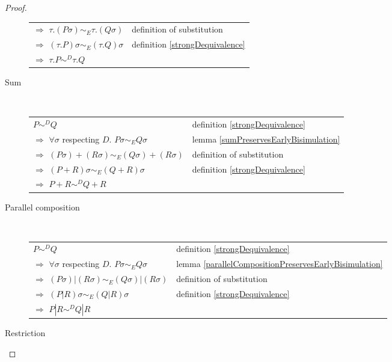 \begin{lemma}
\begin{proof}
\begin{description}
\begin{center}
\begin{tabular}{ll}
	  \\
	      $\Rightarrow$ $\tau.(P\sigma) \sim_{E} \tau.(Q\sigma)$
	    &
	      definition of substitution
	  \\
	      $\Rightarrow$ $(\tau.P)\sigma \sim_{E} (\tau.Q)\sigma$
	    &
	      definition \ref{strongDequivalence}
	  \\
	      $\Rightarrow$ $\tau.P \sim^{D} \tau.Q$
	    &
	  \end{tabular}
	\end{center}
      \item[Sum]\hfill \\
	\begin{center}
	  \begin{tabular}{ll}
	      $P \sim^{D} Q$
	    &
	      definition \ref{strongDequivalence}
	  \\
	      $\Rightarrow$ $\forall \sigma$ respecting $D.$ $P\sigma \sim_{E} Q\sigma$
	    &
	      lemma \ref{sumPreservesEarlyBisimulation}
	  \\
	      $\Rightarrow$ $(P\sigma)+(R\sigma) \sim_{E} (Q\sigma)+(R\sigma)$
	    &
	      definition of substitution
	  \\
	      $\Rightarrow$ $(P+R)\sigma \sim_{E} (Q+R)\sigma$
	    &
	      definition \ref{strongDequivalence}
	  \\
	      $\Rightarrow$ $P+R \sim^{D} Q+R$
	    &
	  \end{tabular}
	\end{center}
      \item[Parallel composition]\hfill \\
	\begin{center}
	  \begin{tabular}{ll}
	      $P \sim^{D} Q$
	    &
	      definition \ref{strongDequivalence}
	  \\
	      $\Rightarrow$ $\forall \sigma$ respecting $D.$ $P\sigma \sim_{E} Q\sigma$
	    &
	      lemma \ref{parallelCompositionPreservesEarlyBisimulation}
	  \\
	      $\Rightarrow$ $(P\sigma)|(R\sigma) \sim_{E} (Q\sigma)|(R\sigma)$
	    &
	      definition of substitution
	  \\
	      $\Rightarrow$ $(P|R)\sigma \sim_{E} (Q|R)\sigma$
	    &
	      definition \ref{strongDequivalence}
	  \\
	      $\Rightarrow$ $P|R \sim^{D} Q|R$
	    &
	  \end{tabular}
	\end{center}
      \item[Restriction]

\end{description}
\end{proof}
\end{lemma}
